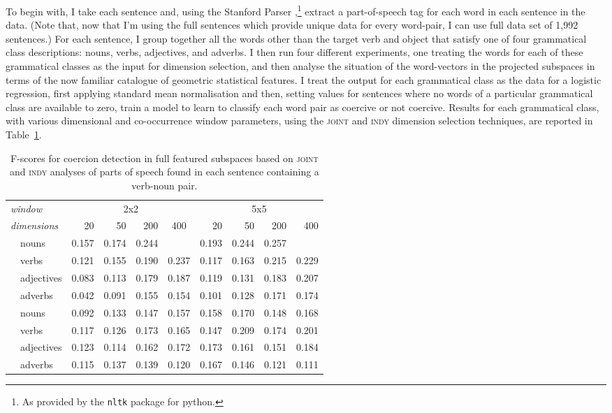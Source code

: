 To begin with, I take each sentence and, using the Stanford Parser \citep{ToutanovaEA2000},\footnote{As provided by the \texttt{nltk} package for python.} extract a part-of-speech tag for each word in each sentence in the data.  (Note that, now that I'm using the full sentences which provide unique data for every word-pair, I can use full data set of 1,992 sentences.)  For each sentence, I group together all the words other than the target verb and object that satisfy one of four grammatical class descriptions: nouns, verbs, adjectives, and adverbs.  I then run four different experiments, one treating the words for each of these grammatical classes as the input for dimension selection, and then analyse the situation of the word-vectors in the projected subspaces in terms of the now familiar catalogue of geometric statistical features.  I treat the output for each grammatical class as the data for a logistic regression, first applying standard mean normalisation and then, setting values for sentences where no words of a particular grammatical class are available to zero, train a model to learn to classify each word pair as coercive or not coercive.  Results for each grammatical class, with various dimensional and co-occurrence window parameters, using the \textsc{joint} and \textsc{indy} dimension selection techniques, are reported in Table~\ref{tab:poses}.

\begin{table}
\centering
\begin{tabular}{llrrrr|rrrr}
\hline
\multicolumn{2}{l}{\emph{window}} & \multicolumn{4}{c}{2x2} & \multicolumn{4}{c}{5x5} \\
\multicolumn{2}{l}{\emph{dimensions}} & 20 & 50 & 200 & \multicolumn{1}{c}{400} & 20 & 50 & 200 & 400 \\
\hline
\parbox[t]{2mm}{} & nouns & 0.157 & 0.174 & 0.244 &  & 0.193 & 0.244 & 0.257 &  \\
& verbs & 0.121 & 0.155 & 0.190 & 0.237 & 0.117 & 0.163 & 0.215 & 0.229 \\
& adjectives & 0.083 & 0.113 & 0.179 & 0.187 & 0.119 & 0.131 & 0.183 & 0.207 \\
& adverbs & 0.042 & 0.091 & 0.155 & 0.154 & 0.101 & 0.128 & 0.171 & 0.174 \\
\hline
\parbox[t]{2mm}{} & nouns & 0.092 & 0.133 & 0.147 & 0.157 & 0.158 & 0.170 & 0.148 & 0.168 \\
& verbs & 0.117 & 0.126 & 0.173 & 0.165 & 0.147 & 0.209 & 0.174 & 0.201 \\
& adjectives & 0.123 & 0.114 & 0.162 & 0.172 & 0.173 & 0.161 & 0.151 & 0.184 \\
& adverbs & 0.115 & 0.137 & 0.139 & 0.120 & 0.167 & 0.146 & 0.121 & 0.111 \\
\hline
\end{tabular}
\caption[Correlations for Part-of-Speech Based Subspaces]{F-scores for coercion detection in full featured subspaces based on \textsc{joint} and \textsc{indy} analyses of parts of speech found in each sentence containing a verb-noun pair.}
\label{tab:poses}
\end{table}

